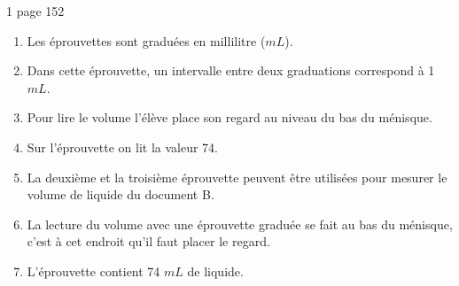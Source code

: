 \begin{myact}{1 page 152}
	\begin{enumerate}
		\item Les éprouvettes sont graduées en millilitre ($mL$).\pause
		\item Dans cette éprouvette, un intervalle entre deux graduations correspond à 1 $mL$.\pause
		\item Pour lire le volume l'élève place son regard au niveau du bas du ménisque.\pause
		\item Sur l'éprouvette on lit la valeur 74.\pause
		\item La deuxième et la troisième éprouvette peuvent être utilisées pour mesurer le volume de liquide du document B.\pause
		\item La lecture du volume avec une éprouvette graduée se fait au bas du ménisque, c'est à cet endroit qu'il faut placer le regard.\pause
		\item L'éprouvette contient 74 $mL$ de liquide.
	\end{enumerate}
\end{myact}